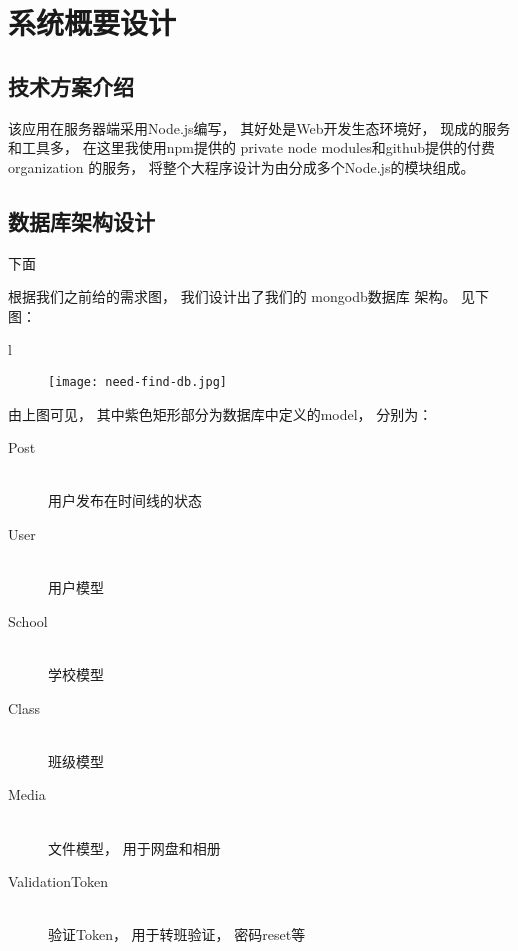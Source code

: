 \chapter{系统概要设计}

\section{技术方案介绍}


该应用在服务器端采用Node.js编写， 其好处是Web开发生态环境好， 现成的服务和工具多， 在这里我使用npm提供的 private node modules和github提供的付费 organization 的服务， 将整个大程序设计为由分成多个Node.js的模块组成。



\section{数据库架构设计}


下面

根据我们之前给的需求图， 我们设计出了我们的 mongodb数据库 架构。 见下图：

\newpage
l \newline
\begin{figure}[H]
	\centering
        \hspace*{-7cm}\texttt{[image: need-find-db.jpg]}
	\label{fig:need-find-db}
\end{figure}

由上图可见， 其中紫色矩形部分为数据库中定义的model， 分别为：


\begin{description}
	\item[Post]  \hfill \\
	\thinspace 用户发布在时间线的状态
		\item[User]  \hfill \\
		\thinspace 用户模型
		\item[School]  \hfill \\
		\thinspace 学校模型
			\item[Class]  \hfill \\
			\thinspace 班级模型
			\item[Media]  \hfill \\
			\thinspace 文件模型， 用于网盘和相册
	\item[ValidationToken]  \hfill \\
	\thinspace 验证Token， 用于转班验证， 密码reset等

\end{description}


